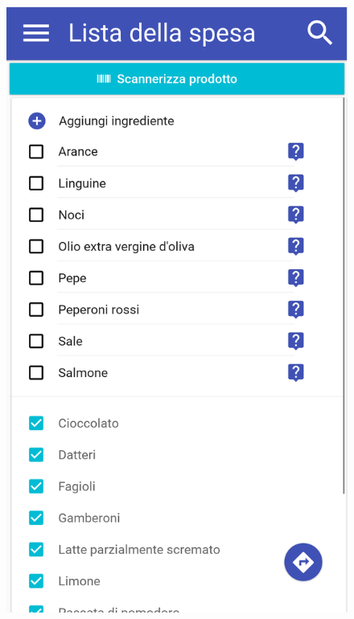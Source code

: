 \begin{figure}[H]
	\begin{minipage}{.49\textwidth}
		\includegraphics[width=\textwidth]{img/wireframe/lista_della_spesa.png}
	\end{minipage}
	\begin{minipage}{.49\textwidth}

\end{minipage}
\end{figure}
